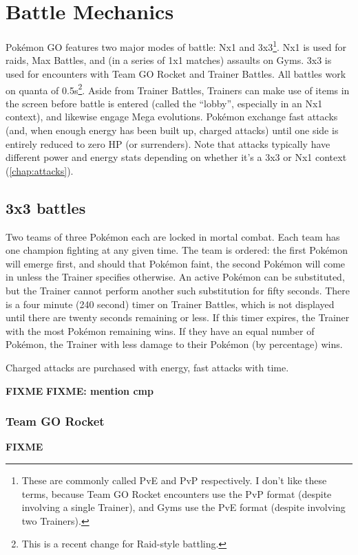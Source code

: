 \chapter{Battle Mechanics}
\label{chap:battle}
Pokémon GO features two major modes of battle: Nx1 and 3x3\footnote{These are commonly called PvE and PvP
 respectively. I don't like these terms, because Team GO Rocket encounters use the PvP format (despite involving
 a single Trainer), and Gyms use the PvE format (despite involving two Trainers).}.
Nx1 is used for raids, Max Battles, and (in a series of 1x1 matches) assaults on Gyms.
3x3 is used for encounters with Team GO Rocket and Trainer Battles.
All battles work on quanta of 0.5s\footnote{This is a recent change for Raid-style battling.}.
Aside from Trainer Battles, Trainers can make use of items in the screen before
  battle is entered (called the ``lobby'', especially in an Nx1 context), and
  likewise engage Mega evolutions.
Pokémon exchange fast attacks (and, when enough energy has been built up, charged attacks)
  until one side is entirely reduced to zero HP (or surrenders).
Note that attacks typically have different power and energy stats depending on
  whether it's a 3x3 or Nx1 context (\autoref{chap:attacks}).

\section{3x3 battles}
\label{sec:3x3}
Two teams of three Pokémon each are locked in mortal combat.
Each team has one champion fighting at any given time.
The team is ordered: the first Pokémon will emerge first, and should that Pokémon
  faint, the second Pokémon will come in unless the Trainer specifies otherwise.
An active Pokémon can be substituted, but the Trainer cannot perform another
  such substitution for fifty seconds.
There is a four minute (240 second) timer on Trainer Battles, which is not displayed
  until there are twenty seconds remaining or less.
If this timer expires, the Trainer with the most Pokémon remaining wins.
If they have an equal number of Pokémon, the Trainer with less damage to their
  Pokémon (by percentage) wins.

Charged attacks are purchased with energy, fast attacks with time.

\textbf{FIXME}
\textbf{FIXME: mention cmp}


\subsection{Team GO Rocket}
\label{sec:rocket}
\textbf{FIXME}

